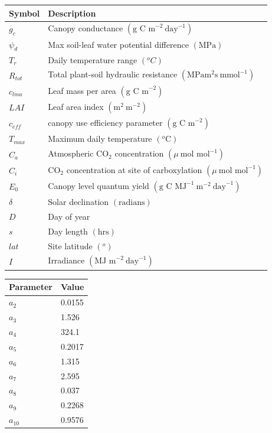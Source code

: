 \begin{center}
\begin{tabular}{| l | l |}
\hline
Symbol & Description \\ \hline
$g_c$ & Canopy conductance $(\text{g C m}^{-2}~\text{day}^{-1})$ \\ \hline
$\psi_d$ & Max soil-leaf water potential difference $(\text{MPa})$ \\ \hline
$T_r$ & Daily temperature range $( ^{o}C)$ \\ \hline
$R_{tot}$ & Total plant-soil hydraulic resistance $(\text{MPa} \text{m}^2 \text{s}~\text{mmol}^{-1})$ \\ \hline
$c_{lma}$ & Leaf mass per area $(\text{g C m}^{-2})$  \\ \hline
$LAI$ & Leaf area index $(\text{m}^2~\text{m}^{-2})$ \\ \hline
$c_{eff}$ &canopy use efficiency parameter $(\text{g C m}^{-2})$  \\ \hline
$T_{max}$ & Maximum daily temperature $( ^{o}\text{C})$  \\ \hline
$C_a$ & Atmospheric CO$_2$ concentration $(\mu~\text{mol mol}^{-1})$ \\ \hline
$C_i$ & CO$_2$ concentration at site of carboxylation $(\mu~\text{mol mol}^{-1})$ \\ \hline
$E_0$ & Canopy level quantum yield $(\text{g C MJ}^{-1}~\text{m}^{-2}~\text{day}^{-1})$ \\ \hline
$\delta$ & Solar declination $(\text{radians})$ \\ \hline
$D$ & Day of year \\ \hline
$s$ & Day length $(\text{hrs})$ \\  \hline  
$lat$ & Site latitude $( ^{o})$ \\ \hline
$I$ & Irradiance $(\text{MJ m}^{-2}~\text{day}^{-1})$ \\ 
\hline
\end{tabular}    
 \label{chap5:table:acm}
\end{center}

\begin{center}
\begin{tabular}{| l | l |}
\hline
Parameter & Value \\ \hline
$a_2$ & 0.0155 \\ \hline
$a_3$ & 1.526 \\ \hline
$a_4$ & 324.1 \\ \hline
$a_5$ & 0.2017 \\ \hline
$a_6$ & 1.315 \\ \hline
$a_7$ & 2.595 \\ \hline
$a_8$ & 0.037 \\ \hline
$a_9$ & 0.2268 \\ \hline
$a_{10}$ & 0.9576 \\
\hline
\end{tabular}    
 \label{chap5:table:acm_params}
\end{center}

